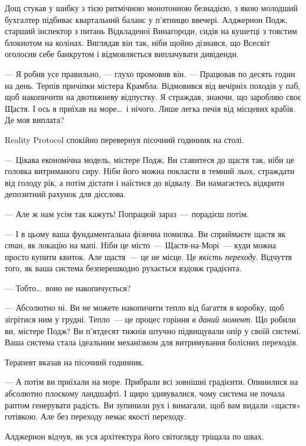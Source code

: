 \documentclass[12pt, a4paper, openany]{book}
\begin{document}
\begin{realitybox}
Дощ стукав у шибку з тією ритмічною монотонною безнадією, з якою молодший бухгалтер підбиває квартальний баланс у п'ятницю ввечері. Алджернон Подж, старший інспектор з питань Відкладеної Винагороди, сидів на кушетці з товстим блокнотом на колінах. Виглядав він так, ніби щойно дізнався, що Всесвіт оголосив себе банкрутом і відмовляється виплачувати дивіденди.

--- Я робив усе правильно, --- глухо промовив він. --- Працював по десять годин на день. Терпів причіпки містера Крамбла. Відмовився від вечірніх походів у паб, щоб накопичити на двотижневу відпустку. Я страждав, знаючи, що заробляю своє Щастя. І ось я приїхав на море\ldots\ і нічого. Лише легка печія від місцевих крабів. Де моя виплата?

\medskip
Reality Protocol спокійно перевернув пісочний годинник на столі.

--- Цікава економічна модель, містере Подж. Ви ставитеся до щастя так, ніби це головка витриманого сиру. Ніби його можна покласти в темний льох, страждати від голоду рік, а потім дістати і наїстися до відвалу. Ви намагаєтесь відкрити депозитний рахунок для дієслова.

--- Але ж нам усім так кажуть! Попрацюй зараз~--- порадієш потім.

--- І в цьому ваша фундаментальна фізична помилка. Ви сприймаєте щастя як \textit{стан}, як локацію на мапі. Ніби це місто~--- Щастя-на-Морі~--- куди можна просто купити квиток. Але щастя~--- це не місце. Це \textit{якість переходу}. Відчуття того, як ваша система безперешкодно рухається вздовж градієнта.

--- Тобто\ldots\ воно не накопичується?

--- Абсолютно ні. Ви не можете накопичити тепло від багаття в коробку, щоб зігрітися ним у грудні. Тепло~--- це процес горіння \textit{в даний момент}. Що робили ви, містере Подж? Ви п'ятдесят тижнів штучно підвищували опір у своїй системі. Ваша система стала ідеальним механізмом для витримування болісних переходів.

Терапевт вказав на пісочний годинник.

--- А потім ви приїхали на море. Прибрали всі зовнішні градієнти. Опинилися на абсолютно плоскому ландшафті. І щиро здивувалися, чому система не почала раптом генерувати радість. Ви зупинили рух і вимагали, щоб вам видали «щастя» готівкою. Але без переходу немає якості переходу.

\medskip
Алджернон відчув, як уся архітектура його світогляду тріщала по швах.


\end{realitybox}
\end{document}
